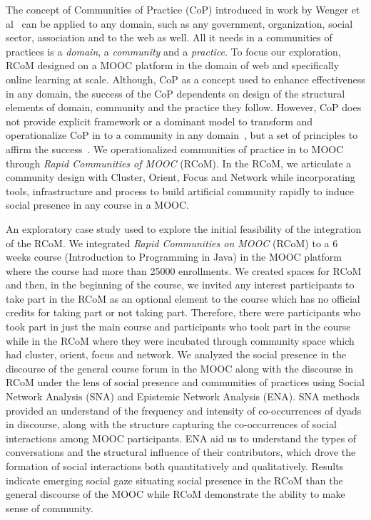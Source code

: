 \documentclass[format=acmsmall, review=false, screen=true]{acmart}
\begin{document}
The concept of Communities of Practice (CoP) introduced in work by Wenger et al~\cite{wenger1999communities} can be applied to any domain, such as any government, organization, social sector, association and to the web as well. All it needs in a communities of practices is a \textit{domain}, a \textit{community} and a \textit{practice}. To focus our exploration, RCoM designed on a MOOC platform in the domain of web and specifically online learning at scale. Although, CoP as a concept used to enhance effectiveness in any domain, the success of the CoP dependents on design of the structural elements of domain, community and the practice they follow. However, CoP does not provide explicit framework or a dominant model to transform and operationalize CoP in to a community in any domain~\cite{li2009evolution}, but a set of principles to affirm the success~\cite{wenger2002seven}. We operationalized communities of practice in to MOOC through \textit{Rapid Communities of MOOC} (RCoM). In the RCoM, we articulate a community design with Cluster, Orient, Focus and Network while incorporating tools, infrastructure and process to build artificial community rapidly to induce social presence in any course in a MOOC. 

An exploratory case study used to explore the initial feasibility of the integration of the RCoM. We integrated \textit{Rapid Communities on MOOC} (RCoM) to a 6 weeks course (Introduction to Programming in Java) in the MOOC platform where the course had more than 25000 enrollments. We created spaces for RCoM and then, in the beginning of the course, we invited any interest participants to take part in the RCoM as an optional element to the course which has no official credits for taking part or not taking part. Therefore, there were participants who took part in just the main course and participants who took part in the course while in the RCoM where they were incubated through community space which had cluster, orient, focus and network. We analyzed the social presence in the discourse of the general course forum in the MOOC along with the discourse in RCoM under the lens of social presence and communities of practices using Social Network Analysis (SNA) and Epistemic Network Analysis (ENA). SNA methods provided an understand of the frequency and intensity of co-occurrences of dyads in discourse, along with the structure capturing the co-occurrences of social interactions among MOOC participants. ENA aid us to understand the types of conversations and the structural influence of their contributors, which drove the formation of social interactions both quantitatively and qualitatively. Results indicate emerging social gaze situating social presence in the RCoM than the general discourse of the MOOC while RCoM demonstrate the ability to make sense of community. 
\end{document}
